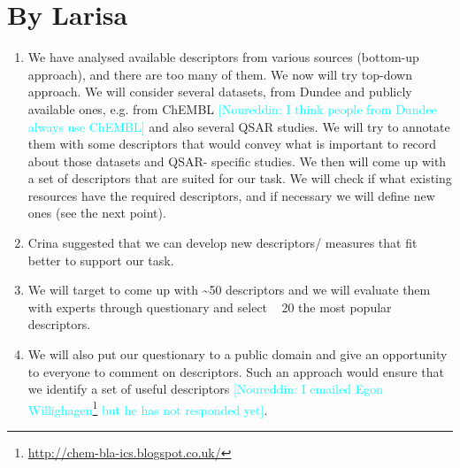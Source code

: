 \documentclass[a4paper,12pt, english]{article}
\newcommand{\kibitz}[2]{\ifnum\Comments=1\textcolor{#1}{#2}\fi}
\newcommand{\ns}[1]{\kibitz{cyan}     {[Noureddin: #1]}}
\begin{document}
\section{By Larisa}
\begin{enumerate}
	\item We have analysed available descriptors from various sources (bottom-up approach), and there are too many of them. We now will try top-down approach. We will consider several datasets, from Dundee and publicly available ones, e.g. from ChEMBL \ns{I think people from Dundee always use ChEMBL} and also several QSAR studies. We will try to annotate them with some descriptors that would convey what is important to record about those datasets and QSAR- specific studies. We then will come up with a set of descriptors that are suited for our task. We will check if what existing resources have the required descriptors, and if necessary we will define new ones (see the next point).
	\item Crina suggested that we can develop new descriptors/ measures that fit better to support our task.
	\item We will target to come up with \textasciitilde50 descriptors and we will evaluate them with experts through questionary and select  ~ 20 the most popular descriptors.
	\item We will also put our questionary to a public domain and give an opportunity to everyone to comment on descriptors. Such an approach would ensure that we identify a set of useful descriptors \ns{I emailed Egon Willighagen\footnote{\url{http://chem-bla-ics.blogspot.co.uk/}} but he has not responded yet}.
\end{enumerate}  
\end{document}
